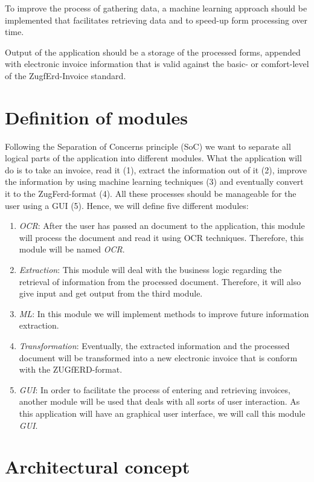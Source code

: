 To improve the process of gathering data, a machine learning approach should be implemented that facilitates retrieving data and to speed-up form processing over time.

Output of the application should be a storage of the processed forms, appended with electronic invoice information that is valid against the basic- or comfort-level of the ZugfErd-Invoice standard.

\section{Definition of modules}
\label{sec5.2}

Following the Separation of Concerns principle (SoC) we want to separate all logical parts of the application into different modules.
What the application will do is to take an invoice, read it (1), extract the information out of it (2), improve the information by using machine learning techniques (3) and eventually convert it to the ZugFerd-format (4). All these processes should be manageable for the user using a GUI (5).
Hence, we will define five different modules:
\begin{enumerate}
	\item \emph{OCR}: After the user has passed an document to the application, this module will process the document and read it using OCR techniques. Therefore, this module will be named \emph{OCR}.
	\item \emph{Extraction}: This module will deal with the business logic regarding the retrieval of information from the processed document. Therefore, it will also give input and get output from the third module.
	\item \emph{ML}: In this module we will implement methods to improve future information extraction.
	\item \emph{Transformation}: Eventually, the extracted information and the processed document will be transformed into a new electronic invoice that is conform with the ZUGfERD-format.
	\item \emph{GUI}: In order to facilitate the process of entering and retrieving invoices, another module will be used that deals with all sorts of user interaction. As this application will have an graphical user interface, we will call this module \emph{GUI}.
\end{enumerate}

\section{Architectural concept}
\label{sec5.3}

